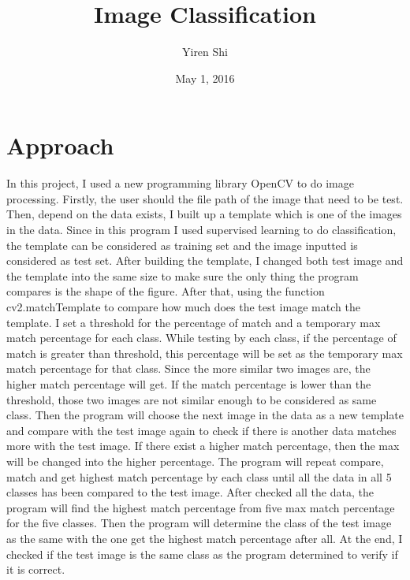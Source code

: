 \documentclass[12pt, oneside]{report}
\title{Image Classification}
\author{Yiren Shi}
\date{May 1, 2016}
\begin{document}
	\maketitle
	
	\section{Approach}
		In this project, I used a new programming library OpenCV to do image processing. Firstly, the user should the file path of the image that need to be test. Then, depend on the data exists, I built up a template which is one of the images in the data. Since in this program I used supervised learning to do classification, the template can be considered as training set and the image inputted is considered as test set. After building the template, I changed both test image and the template into the same size to make sure the only thing the program compares is the shape of the figure. After that, using the function cv2.matchTemplate to compare how much does the test image match the template. I set a threshold for the percentage of match and a temporary max match percentage for each class. While testing by each class, if the percentage of match is greater than threshold, this percentage will be set as the temporary max match percentage for that class. Since the more similar two images are, the higher match percentage will get. If the match percentage is lower than the threshold, those two images are not similar enough to be considered as same class. Then the program will choose the next image in the data as a new template and compare with the test image again to check if there is another data matches more with the test image. If there exist a higher match percentage, then the max will be changed into the higher percentage. The program will repeat compare, match and get highest match percentage by each class until all the data in all 5 classes has been compared to the test image. After checked all the data, the program will find the highest match percentage from five max match percentage for the five classes. Then the program will determine the class of the test image as the same with the one get the highest match percentage after all. At the end, I checked if the test image is the same class as the program determined to verify if it is correct.
\end{document}
